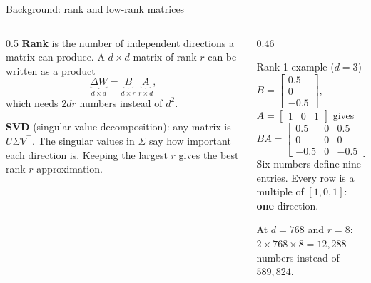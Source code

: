 \documentclass[aspectratio=169,11pt]{beamer}
\begin{document}
\begin{frame}{Background: rank and low-rank matrices}
  \begin{columns}[T]
    \begin{column}{0.5\textwidth}
      \small
      \textbf{Rank} is the number of independent directions a matrix can produce.
      A $d\times d$ matrix of rank $r$ can be written as a product
      \[
        \underbrace{\Delta W}_{d\times d}=\underbrace{B}_{d\times r}\;\underbrace{A}_{r\times d},
      \]
      which needs $2dr$ numbers instead of $d^2$.
      \vspace{1mm}

      \textbf{SVD} (singular value decomposition): any matrix is $U\Sigma V^\top$.
      The singular values in $\Sigma$ say how important each direction is. Keeping the largest $r$ gives the best rank-$r$ approximation.
    \end{column}
    \begin{column}{0.46\textwidth}
      \begin{exampleblock}{Rank-1 example ($d=3$)}
        \small
        $B=\begin{bmatrix}0.5\\0\\-0.5\end{bmatrix}$, $A=\begin{bmatrix}1&0&1\end{bmatrix}$ gives
        \[
          BA=\begin{bmatrix}0.5&0&0.5\\0&0&0\\-0.5&0&-0.5\end{bmatrix}
        \]
        Six numbers define nine entries. Every row is a multiple of $[1,0,1]$: \textbf{one} direction.
        \vspace{1mm}

        At $d=768$ and $r=8$: $2\times768\times8=12{,}288$ numbers instead of $589{,}824$.
      \end{exampleblock}
    \end{column}
  \end{columns}
\end{frame}
\end{document}
